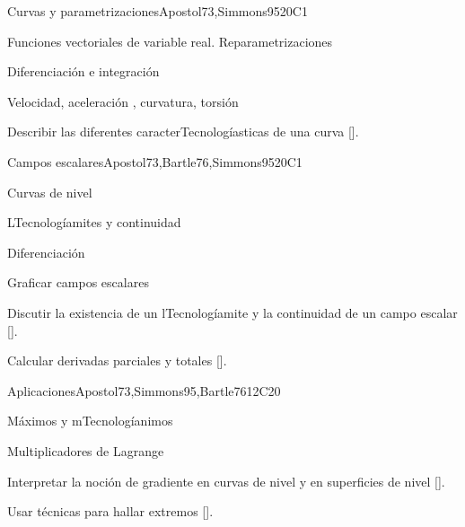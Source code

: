 \begin{syllabus}
\begin{unit}{}{Curvas y parametrizaciones}{Apostol73,Simmons95}{20}{C1}
   \begin{topics}
      \item Funciones vectoriales de variable real. Reparametrizaciones
      \item Diferenciación  e integración 
      \item Velocidad, aceleración , curvatura, torsión 
      \end{topics}
   \begin{learningoutcomes}
      \item Describir las diferentes caracterTecnologíasticas  de una curva [\Usage].
      \end{learningoutcomes}
\end{unit}

\begin{unit}{}{Campos escalares}{Apostol73,Bartle76,Simmons95}{20}{C1}
   \begin{topics}
      \item Curvas de nivel
      \item LTecnologíamites y continuidad
      \item Diferenciación
      \end{topics}
   \begin{learningoutcomes}
      \item Graficar campos escalares
      \item Discutir la existencia de un lTecnologíamite y la continuidad de un campo escalar [\Usage].
      \item Calcular derivadas parciales y totales [\Usage].
      \end{learningoutcomes}
\end{unit}

\begin{unit}{}{Aplicaciones}{Apostol73,Simmons95,Bartle76}{12}{C20}
   \begin{topics}
      \item Máximos y mTecnologíanimos
      \item Multiplicadores de Lagrange
      \end{topics}
   \begin{learningoutcomes}
      \item Interpretar la noción de gradiente en curvas de nivel y en superficies de nivel [\Usage].
      \item Usar técnicas para hallar extremos [\Usage].
      \end{learningoutcomes}
\end{unit}


\end{syllabus}
